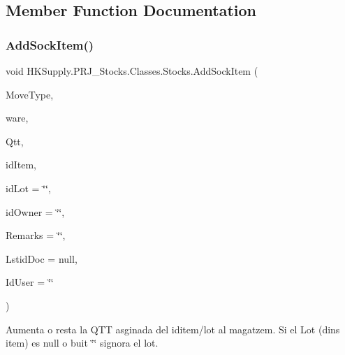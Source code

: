 \subsection{Member Function Documentation}
\mbox{\label{class_h_k_supply_1_1_p_r_j___stocks_1_1_classes_1_1_stocks_a8d5d9d499ae9b864319d1abf46ac7705}} 
\subsubsection{\texorpdfstring{Add\+Sock\+Item()}{AddSockItem()}}
{\footnotesize\ttfamily void H\+K\+Supply.\+P\+R\+J\+\_\+\+Stocks.\+Classes.\+Stocks.\+Add\+Sock\+Item (\begin{DoxyParamCaption}\item[{Stock\+Movements\+Type}]{Move\+Type,  }\item[{\mbox{\hyperlink{class_h_k_supply_1_1_p_r_j___stocks_1_1_classes_1_1_stocks_1_1_warehouse}{Warehouse}}}]{ware,  }\item[{decimal}]{Qtt,  }\item[{string}]{id\+Item,  }\item[{string}]{id\+Lot = {\ttfamily \char`\"{}\char`\"{}},  }\item[{string}]{id\+Owner = {\ttfamily \char`\"{}\char`\"{}},  }\item[{string}]{Remarks = {\ttfamily \char`\"{}\char`\"{}},  }\item[{List$<$ string $>$}]{Lstid\+Doc = {\ttfamily null},  }\item[{string}]{Id\+User = {\ttfamily \char`\"{}\char`\"{}} }\end{DoxyParamCaption})}



Aumenta o resta la Q\+TT asginada del iditem/lot al magatzem. Si el Lot (dins item) es null o buit \char`\"{}\char`\"{} s\textquotesingle{}ignora el lot. 


